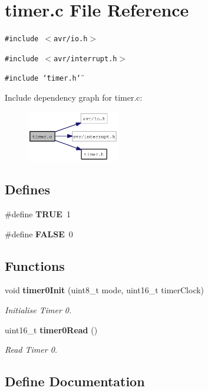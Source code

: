 \section{timer.c File Reference}
\label{timer_8c}
{\tt \#include $<$avr/io.h$>$}\par
{\tt \#include $<$avr/interrupt.h$>$}\par
{\tt \#include \char`\"{}timer.h\char`\"{}}\par


Include dependency graph for timer.c:\nopagebreak
\begin{figure}[H]
\begin{center}
\leavevmode
\includegraphics[width=114pt]{timer_8c__incl}
\end{center}
\end{figure}
\subsection*{Defines}
\begin{CompactItemize}
\item 
\#define {\bf TRUE}~1
\item 
\#define {\bf FALSE}~0
\end{CompactItemize}
\subsection*{Functions}
\begin{CompactItemize}
\item 
void {\bf timer0Init} (uint8\_\-t mode, uint16\_\-t timerClock)
\begin{CompactList}\small\item\em Initialise Timer 0. \item\end{CompactList}\item 
uint16\_\-t {\bf timer0Read} ()
\begin{CompactList}\small\item\em Read Timer 0. \item\end{CompactList}\end{CompactItemize}


\subsection{Define Documentation}
